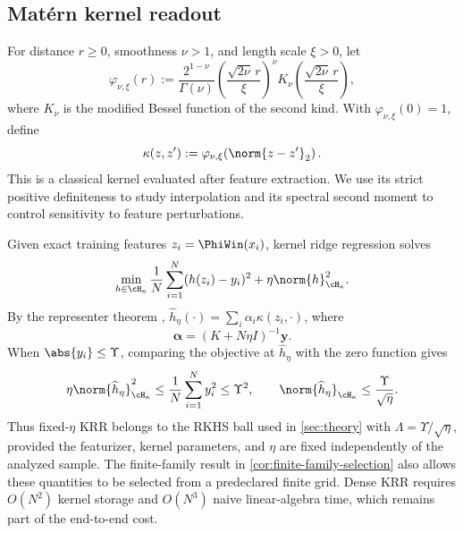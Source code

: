 \subsection{Mat\'ern kernel readout}

For distance \(r\geq0\), smoothness \(\nu>1\), and length scale \(\xi>0\), let
\begin{equation}
    \varphi_{\nu,\xi}(r)
    :=
    \frac{2^{1-\nu}}{\Gamma(\nu)}
    \left(\frac{\sqrt{2\nu}\,r}{\xi}\right)^\nu
    K_\nu\!\left(\frac{\sqrt{2\nu}\,r}{\xi}\right),
    \label{eq:matern-profile}
\end{equation}
where \(K_\nu\) is the modified Bessel function of the second kind. With
\(\varphi_{\nu,\xi}(0)=1\), define
\begin{equation}
    \kappa(z,z')
    :=
    \varphi_{\nu,\xi}\!\left(\norm{z-z'}_2\right).
    \label{eq:matern-kernel}
\end{equation}
This is a classical kernel evaluated after feature extraction. We use its
strict positive definiteness to study interpolation and its spectral second
moment to control sensitivity to feature perturbations.

Given exact training features \(z_i=\PhiWin(x_i)\), kernel ridge regression
solves
\begin{equation}
    \min_{h\in\cH_\kappa}
    \frac1N\sum_{i=1}^N(h(z_i)-y_i)^2
    +\eta\norm{h}_{\cH_\kappa}^2.
    \label{eq:krr-objective}
\end{equation}
By the representer theorem \citep{KimeldorfWahba1971,ScholkopfSmola2002},
\(\widehat h_\eta(\cdot)=\sum_i\alpha_i\kappa(z_i,\cdot)\), where
\[
    \bm\alpha=(K+N\eta I)^{-1}\bm y.
\]
When \(\abs{y_i}\leq\Upsilon\), comparing the objective at
\(\widehat h_\eta\) with the zero function gives
\begin{equation}
    \eta\norm{\widehat h_\eta}_{\cH_\kappa}^2
    \leq \frac1N\sum_{i=1}^N y_i^2
    \leq \Upsilon^2,
    \qquad
    \norm{\widehat h_\eta}_{\cH_\kappa}
    \leq \frac{\Upsilon}{\sqrt\eta}.
    \label{eq:krr-norm-bound}
\end{equation}
Thus fixed-\(\eta\) KRR belongs to the RKHS ball used in
\cref{sec:theory} with \(\Lambda=\Upsilon/\sqrt\eta\), provided the featurizer,
kernel parameters, and \(\eta\) are fixed independently of the analyzed
sample. The finite-family result in \cref{cor:finite-family-selection} also
allows these quantities to be selected from a predeclared finite grid. Dense
KRR requires \(O(N^2)\) kernel storage and \(O(N^3)\) naive linear-algebra time,
which remains part of the end-to-end cost.


